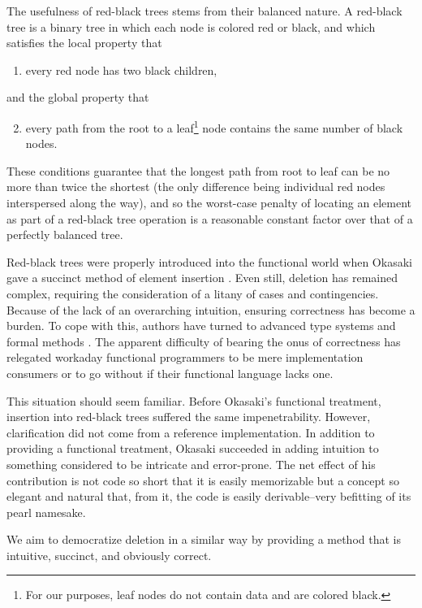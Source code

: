 \documentclass[preprint]{sigplanconf}
\begin{document}
The usefulness of red-black trees stems from their balanced nature. A red-black tree is a binary tree in which each node is colored red or black, and which satisfies the local property that
\begin{enumerate}
\item every red node has two black children,
\end{enumerate}
and the global property that
\begin{enumerate}
\setcounter{enumi}{1}
\item every path from the root to a leaf\footnote{For our purposes, leaf nodes do not contain data and are colored black.} node contains the same number of black nodes.
\end{enumerate}
These conditions guarantee that the longest path from root to leaf can be no more than twice the shortest (the only difference being individual red nodes interspersed along the way), and so the worst-case penalty of locating an element as part of a red-black tree operation is a reasonable constant factor over that of a perfectly balanced tree.

Red-black trees were properly introduced into the functional world when Okasaki gave a succinct method of element insertion \cite{okasaki1999functional}. Even still, deletion has remained complex, requiring the consideration of a litany of cases and contingencies. Because of the lack of an overarching intuition, ensuring correctness has become a burden. To cope with this, authors have turned to advanced type systems \cite{kahrs2001red} and formal methods \cite{appel2011efficient}. The apparent difficulty of bearing the onus of correctness has relegated workaday functional programmers to be mere implementation consumers or to go without if their functional language lacks one.

This situation should seem familiar. Before Okasaki's functional treatment, insertion into red-black trees suffered the same impenetrability. However, clarification did not come from a reference implementation. In addition to providing a functional treatment, Okasaki succeeded in adding intuition to something considered to be intricate and error-prone. The net effect of his contribution is not code so short that it is easily memorizable but a concept so elegant and natural that, from it, the code is easily derivable--very befitting of its pearl namesake.

We aim to democratize deletion in a similar way by providing a method that is intuitive, succinct, and obviously correct.
\end{document}
